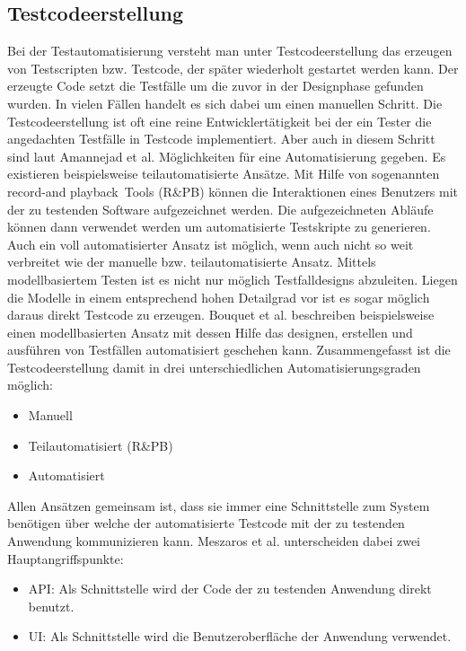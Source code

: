 \subsection{Testcodeerstellung}
\label{subsec:testcodeerstellung}
Bei der Testautomatisierung versteht man unter Testcodeerstellung das erzeugen von Testscripten bzw. Testcode, der später wiederholt gestartet werden kann. Der erzeugte Code setzt die Testfälle um die zuvor in der Designphase gefunden wurden.
In vielen Fällen handelt es sich dabei um einen manuellen Schritt. Die Testcodeerstellung ist oft eine reine Entwicklertätigkeit bei der ein Tester die angedachten Testfälle in Testcode implementiert.
Aber auch in diesem Schritt sind laut Amannejad et al. \cite{amannejad_search-based_2014} Möglichkeiten für eine Automatisierung gegeben.
Es existieren beispielsweise teilautomatisierte Ansätze. Mit Hilfe von sogenannten \grq record-and playback\grq\ Tools (R\&PB) können die Interaktionen eines Benutzers mit der zu testenden Software aufgezeichnet werden. Die aufgezeichneten Abläufe können dann verwendet werden um automatisierte Testskripte zu generieren.
Auch ein voll automatisierter Ansatz ist möglich, wenn auch nicht so weit verbreitet wie der manuelle bzw. teilautomatisierte Ansatz.
Mittels modellbasiertem Testen ist es nicht nur möglich Testfalldesigns abzuleiten. Liegen die Modelle in einem entsprechend hohen Detailgrad vor ist es sogar möglich daraus direkt Testcode zu erzeugen. Bouquet et al. \cite{bouquet_test_2008} beschreiben beispielsweise einen modellbasierten Ansatz mit dessen Hilfe das designen, erstellen und ausführen von Testfällen automatisiert geschehen kann. 
Zusammengefasst ist die Testcodeerstellung damit in drei unterschiedlichen Automatisierungsgraden möglich:
\begin{itemize}
\item Manuell
\item Teilautomatisiert (R\&PB)
\item Automatisiert
\end{itemize}

Allen Ansätzen gemeinsam ist, dass sie immer eine Schnittstelle zum System benötigen über welche der automatisierte Testcode mit der zu testenden Anwendung kommunizieren kann.
Meszaros et al. \cite{meszaros_agile_2003} unterscheiden dabei zwei Hauptangriffspunkte:
\begin{itemize}
\item API: Als Schnittstelle wird der Code der zu testenden Anwendung direkt benutzt.
\item UI: Als Schnittstelle wird die Benutzeroberfläche der Anwendung verwendet.
\end{itemize}

